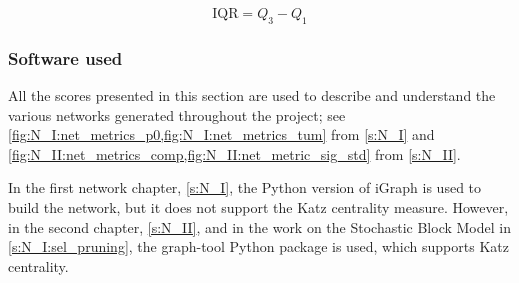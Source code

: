 \begin{equation} \label{eq:iqr}
  \text{IQR} = Q_3 - Q_1
\end{equation}


\subsubsection*{Software used} \label{s:lit:net_software}

All the scores presented in this section are used to describe and understand the various networks generated throughout the project; see \cref{fig:N_I:net_metrics_p0,fig:N_I:net_metrics_tum} from \cref{s:N_I} and \cref{fig:N_II:net_metrics_comp,fig:N_II:net_metric_sig_std} from \cref{s:N_II}. 

In the first network chapter, \cref{s:N_I}, the Python version of iGraph \citep{Csardi2006-ez} is used to build the network, but it does not support the Katz centrality measure. However, in the second chapter, \cref{s:N_II}, and in the work on the Stochastic Block Model in \cref{s:N_I:sel_pruning}, the graph-tool Python package \citep{Peixoto2014-ls} is used, which supports Katz centrality.

